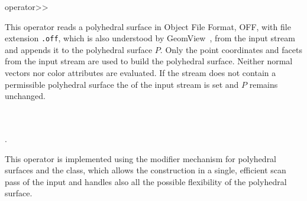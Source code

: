

\ccHtmlNoClassLinks
\begin{ccRefFunction}{operator>>}
\label{refPolyhedron_operator_rightshift}

\ccDefinition

This operator reads a polyhedral surface in Object File Format, OFF,
with file extension {\tt .off}, which is also understood by
GeomView~\cite{p-gmgv15-94}, from the input stream  and
appends it to the polyhedral surface $P$.  Only the point coordinates
and facets from the input stream are used to build the polyhedral
surface. Neither normal vectors nor color attributes are evaluated. If
the stream  does not contain a permissible polyhedral surface
the  of the input stream  is set and $P$ remains 
unchanged.


  
\ccSeeAlso

\\ 
\\
.

\ccImplementation

This operator is implemented using the modifier mechanism for
polyhedral surfaces and the 
class, which allows the construction in a single, efficient scan pass
of the input and handles also all the possible flexibility of the
polyhedral surface.


\end{ccRefFunction}


